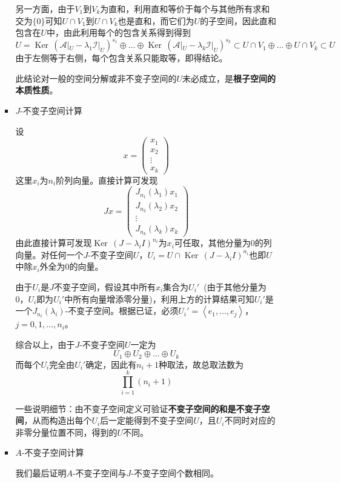 \documentclass[a4paper,UTF8,fontset=windows,AutoFakeBold]{ctexart}
\DeclareMathOperator{\Ker}{Ker\,}
\newcommand*{\ma}{\mathcal{A}}
\newcommand*{\mi}{\mathcal{I}}
\newcommand*{\note}{\noindent *}
\begin{document}
\begin{enumerate}
\begin{enumerate}
\begin{itemize}
{                另一方面，由于$V_1$到$V_k$为直和，利用直和等价于每个与其他所有求和交为$\{0\}$可知$U\cap V_1$到$U\cap V_k$也是直和，而它们为$U$的子空间，因此直和包含在$U$中，由此利用每个的包含关系得到得到
                $$U=\Ker(\ma|_U-\lambda_1\mi|_U)^{s_1}\oplus\dots\oplus\Ker(\ma|_U-\lambda_k\mi|_U)^{s_k}\subset U\cap V_1\oplus\dots\oplus U\cap V_k\subset U$$
                由于左侧等于右侧，每个包含关系只能取等，即得结论。
            }
            
            \note 此结论对一般的空间分解或非不变子空间的$U$未必成立，是\textbf{根子空间的本质性质}。

            \item $J$-不变子空间计算
            
            设
            $$x=\begin{pmatrix}x_1\\x_2\\\vdots\\x_k\end{pmatrix}$$
            这里$x_i$为$n_i$阶列向量。直接计算可发现
            $$Jx=\begin{pmatrix}J_{n_1}(\lambda_1)x_1\\J_{n_2}(\lambda_2)x_2\\\vdots\\J_{n_k}(\lambda_k)x_k\end{pmatrix}$$
            由此直接计算可发现$\Ker(J-\lambda_iI)^{n_i}$为$x_i$可任取，其他分量为0的列向量。对任何一个$J$-不变子空间$U$，$U_i=U\cap\Ker(J-\lambda_iI)^{n_i}$也即$U$中除$x_i$外全为0的向量。

            由于$U_i$是$J$不变子空间，假设其中所有$x_i$集合为$U_i'$\ (由于其他分量为0，$U_i$即为$U_i'$中所有向量增添零分量)，利用上方的计算结果可知$U_i'$是一个$J_{n_i}(\lambda_i)$-不变子空间。根据已证，必须$U_i'=\left<e_1,\dots,e_j\right>$，$j=0,1,\dots,n_i$。

            综合以上，由于$J$-不变子空间$U$一定为
            $$U_1\oplus U_2\oplus\dots\oplus U_k$$
            而每个$U_i$完全由$U_i'$确定，因此有$n_i+1$种取法，故总取法数为
            $$\prod_{i=1}^k(n_i+1)$$

            \note 一些说明细节：由不变子空间定义可验证\textbf{不变子空间的和是不变子空间}，从而构造出每个$U_i$后一定能得到不变子空间$U$，且$U_i$不同时对应的非零分量位置不同，得到的$U$不同。

            \item $A$-不变子空间计算
            
            我们最后证明$A$-不变子空间与$J$-不变子空间个数相同。


\end{itemize}
\end{enumerate}
\end{enumerate}
\end{document}
